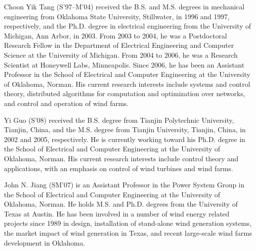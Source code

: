 \documentclass[journal]{IEEEtran}
\begin{document}



\begin{IEEEbiographynophoto}{Choon Yik Tang} (S'97--M'04) received the B.S. and M.S. degrees in mechanical engineering from Oklahoma State University, Stillwater, in 1996 and 1997, respectively, and the Ph.D. degree in electrical engineering from the University of Michigan, Ann Arbor, in 2003. From 2003 to 2004, he was a Postdoctoral Research Fellow in the Department of Electrical Engineering and Computer Science at the University of Michigan. From 2004 to 2006, he was a Research Scientist at Honeywell Labs, Minneapolis. Since 2006, he has been an Assistant Professor in the School of Electrical and Computer Engineering at the University of Oklahoma, Norman. His current research interests include systems and control theory, distributed algorithms for computation and optimization over networks, and control and operation of wind farms.
\end{IEEEbiographynophoto}

\begin{IEEEbiographynophoto}{Yi Guo} (S'08) received the B.S. degree from Tianjin Polytechnic University, Tianjin, China, and the M.S. degree from Tianjin University, Tianjin, China, in 2002 and 2005, respectively. He is currently working toward his Ph.D. degree in the School of Electrical and Computer Engineering at the University of Oklahoma, Norman. His current research interests include control theory and applications, with an emphasis on control of wind turbines and wind farms.
\end{IEEEbiographynophoto}

\begin{IEEEbiographynophoto}{John N. Jiang} (SM'07) is an Assistant Professor in the Power System Group in the School of Electrical and Computer Engineering at the University of Oklahoma, Norman. He holds M.S. and Ph.D. degrees from the University of Texas at Austin. He has been involved in a number of wind energy related projects since 1989 in design, installation of stand-alone wind generation systems, the market impact of wind generation in Texas, and recent large-scale wind farms development in Oklahoma.
\end{IEEEbiographynophoto}
\end{document}
